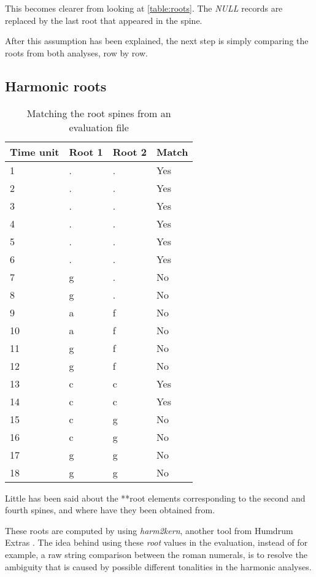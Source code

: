 		This becomes clearer from looking at \autoref{table:roots}. The \emph{NULL} records are replaced by the last root that appeared in the spine.

		After this assumption has been explained, the next step is simply comparing the roots from both analyses, row by row.

	\subsection{Harmonic roots}
		\begin{table}[]
		\centering
		\begin{tabular}{|l|l|l|l|}
		\hline
		Time unit & Root 1 & Root 2 & Match \\ \hline
		1 & . & . & Yes \\ \hline
		2 & . & . & Yes \\ \hline
		3 & . & . & Yes \\ \hline
		4 & . & . & Yes \\ \hline
		5 & . & . & Yes \\ \hline
		6 & . & . & Yes \\ \hline
		7 & g & . & No \\ \hline
		8 & g & . & No \\ \hline
		9 & a & f & No \\ \hline
		10 & a & f & No \\ \hline
		11 & g & f & No \\ \hline
		12 & g & f & No \\ \hline
		13 & c & c & Yes \\ \hline
		14 & c & c & Yes \\ \hline
		15 & c & g & No \\ \hline
		16 & c & g & No \\ \hline
		17 & g & g & No \\ \hline
		18 & g & g & No \\ \hline
		\end{tabular}
		\caption{Matching the root spines from an evaluation file}
		\label{table:matches}
		\end{table}

		Little has been said about the **root elements corresponding to the second and fourth spines, and where have they been obtained from.

		These roots are computed by using \emph{harm2kern}, another tool from Humdrum Extras \cite{humextra}. The idea behind using these \emph{root} values in the evaluation, instead of for example, a raw string comparison between the roman numerals, is to resolve the ambiguity that is caused by possible different tonalities in the harmonic analyses.

